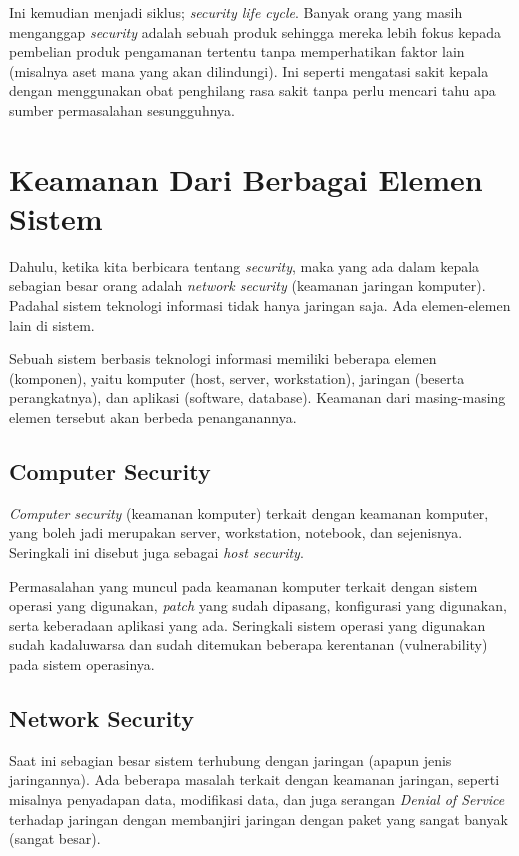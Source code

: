 Ini kemudian menjadi siklus; {\em security life cycle}. Banyak orang yang masih
menganggap {\em security} adalah sebuah produk sehingga mereka lebih fokus
kepada pembelian produk pengamanan tertentu tanpa memperhatikan faktor lain
(misalnya aset mana yang akan dilindungi). Ini seperti mengatasi sakit kepala
dengan menggunakan obat penghilang rasa sakit tanpa perlu mencari tahu apa
sumber permasalahan sesungguhnya.


\section{Keamanan Dari Berbagai Elemen Sistem}
Dahulu, ketika kita berbicara tentang {\em security}, maka yang ada dalam
kepala sebagian besar orang adalah {\em network security} (keamanan jaringan
komputer). Padahal sistem teknologi informasi tidak hanya jaringan saja. Ada
elemen-elemen lain di sistem.

Sebuah sistem berbasis teknologi informasi memiliki beberapa elemen (komponen),
yaitu komputer (host, server, workstation), jaringan (beserta perangkatnya),
dan aplikasi (software, database). Keamanan dari masing-masing elemen tersebut
akan berbeda penanganannya.

\subsection{Computer Security}
{\em Computer security} (keamanan komputer) terkait dengan keamanan komputer,
yang boleh jadi merupakan server, workstation, notebook, dan sejenisnya.
Seringkali ini disebut juga sebagai {\em host security}.

Permasalahan yang muncul pada keamanan komputer terkait dengan sistem operasi
yang digunakan, {\em patch} yang sudah dipasang, konfigurasi yang digunakan,
serta keberadaan aplikasi yang ada. Seringkali sistem operasi yang digunakan
sudah kadaluwarsa dan sudah ditemukan beberapa kerentanan (vulnerability) pada
sistem operasinya.

\subsection{Network Security}
Saat ini sebagian besar sistem terhubung dengan jaringan (apapun jenis
jaringannya). Ada beberapa masalah terkait dengan keamanan jaringan, seperti
misalnya penyadapan data, modifikasi data, dan juga serangan {\em Denial of
Service} terhadap jaringan dengan membanjiri jaringan dengan paket yang sangat
banyak (sangat besar).


